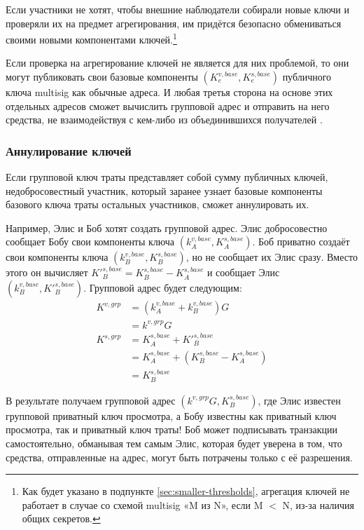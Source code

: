 Если участники не хотят, чтобы внешние наблюдатели собирали новые ключи и проверяли их на предмет агрегирования, им придётся безопасно обмениваться своими новыми компонента\-ми ключей.\footnote{Как будет указано в подпункте \ref{sec:smaller-thresholds}, агрегация ключей не работает в случае со схемой multisig «M из N», если M $<$ N, из-за наличия общих секретов.}

Если проверка на агрегирование ключей не является для них проблемой, то они могут публи\-ковать свои базовые компоненты $(K^{v,base}_e,K^{s,base}_e)$ публичного ключа multisig как обычные адреса. И любая третья сторона на основе этих отдельных адресов сможет вычислить группо\-вой адрес и отправить на него средства, не взаимодействуя с кем-либо из объединившихся получателей \cite{maxwell2018simple-musig}.

\subsubsection*{Аннулирование ключей}

Если групповой ключ траты представляет собой сумму публичных ключей, недобросовестный участник, который заранее узнает базовые компоненты базового ключа траты остальных участников, сможет аннулировать их.

Например, Элис и Боб хотят создать групповой адрес. Элис добросовестно сообщает Бобу свои компоненты ключа $(k^{v,base}_A,K^{s,base}_A)$. Боб приватно создаёт свои компоненты ключа $(k^{v,base}_B,K^{s,base}_B)$, но не сообщает их Элис сразу. Вместо этого он вычисляет $K'^{s,base}_B = K^{s,base}_B - K^{s,base}_A$ и сообщает Элис $(k^{v,base}_B,K'^{s,base}_B)$. Групповой адрес будет следующим:\vspace{.175cm}
\begin{align*}
    K^{v,grp} &= (k^{v,base}_A + k^{v,base}_B) G \\
             &= k^{v,grp} G\\
    K^{s,grp} &= K^{s,base}_A + K'^{s,base}_B \\
             &= K^{s,base}_A + (K^{s,base}_B - K^{s,base}_A)\\
             &= K^{s,base}_B
\end{align*}

В результате получаем групповой адрес $(k^{v,grp} G,K^{s,base}_B)$, где Элис известен групповой приват\-ный ключ просмотра, а Бобу известны как приватный ключ просмотра, так и приватный ключ траты! Боб может подписывать транзакции самостоятельно, обманывая тем самым Элис, которая будет уверена в том, что средства, отправленные на адрес, могут быть потрачены только с её разрешения.

